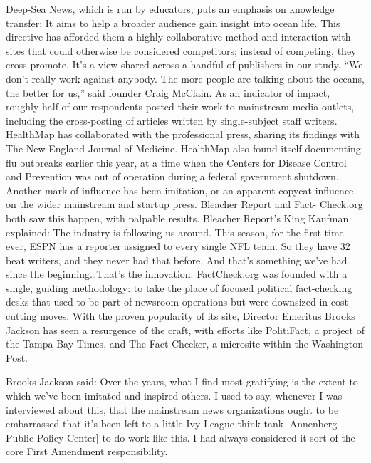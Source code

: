 Deep-Sea News, which is run by educators, puts an emphasis on knowledge
transfer: It aims to help a broader audience gain insight into ocean life. This
directive has afforded them a highly collaborative method and interaction
with sites that could otherwise be considered competitors; instead of competing,
they cross-promote. It’s a view shared across a handful of publishers
in our study.
``We don’t really work against anybody. The more people are talking about
the oceans, the better for us,'' said founder Craig McClain.
As an indicator of impact, roughly half of our respondents posted their work
to mainstream media outlets, including the cross-posting of articles written
by single-subject staff writers. HealthMap has collaborated with the professional
press, sharing its findings with The New England Journal of Medicine.
HealthMap also found itself documenting flu outbreaks earlier this year,
at a time when the Centers for Disease Control and Prevention was out of
operation during a federal government shutdown.
Another mark of influence has been imitation, or an apparent copycat influence
on the wider mainstream and startup press. Bleacher Report and Fact-
Check.org both saw this happen, with palpable results. Bleacher Report’s
King Kaufman explained:
The industry is following us around. This season, for the first time
ever, ESPN has a reporter assigned to every single NFL team. So
they have 32 beat writers, and they never had that before. And that’s
something we’ve had since the beginning…That’s the innovation.
FactCheck.org was founded with a single, guiding methodology: to take
the place of focused political fact-checking desks that used to be part of
newsroom operations but were downsized in cost-cutting moves. With the
proven popularity of its site, Director Emeritus Brooks Jackson has seen a
resurgence of the craft, with efforts like PolitiFact, a project of the Tampa
Bay Times, and The Fact Checker, a microsite within the Washington Post.

Brooks Jackson said:
Over the years, what I find most gratifying is the extent to which
we’ve been imitated and inspired others. I used to say, whenever I
was interviewed about this, that the mainstream news organizations
ought to be embarrassed that it’s been left to a little Ivy League think
tank [Annenberg Public Policy Center] to do work like this. I had
always considered it sort of the core First Amendment responsibility.


